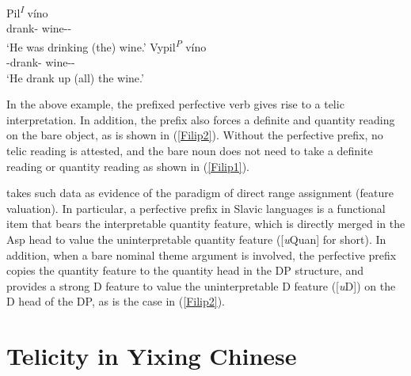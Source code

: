 \documentclass[output=paper]{langsci/langscibook}
\begin{document}
\begin{exe}
\ex {} \parencite[62]{filip1997}
    \begin{xlist}
	\ex\label{Filip1} \gll Pil\textsuperscript{\emph{I}} v\'ino \\
	        {drank-\Sg{}{}} {wine-\Sg{}-\Acc{}} \\
	    \glt \enquote*{He was drinking (the) wine.}
    \ex\label{Filip2} \gll  Vypil\textsuperscript{\emph{P}} v\'ino\\
            {\Pfv{}-drank-\Sg{}{}} {wine-\Sg{}-\Acc{}} \\
        \glt \enquote*{He drank up (all) the wine.}
\end{xlist}
\end{exe}

In the above example, the prefixed perfective verb gives rise to a telic
interpretation. In     addition, the prefix also forces a definite and quantity
reading on the bare object, as is shown in (\ref{Filip2}). Without the
perfective prefix, no telic reading is attested, and the bare noun does not
need to take a definite reading or quantity reading as shown in (\ref{Filip1}).

\textcite{Borer2005b} takes such data as evidence of the paradigm of direct
range assignment (feature valuation). In particular, a perfective prefix in
Slavic languages is a functional item that bears the interpretable quantity
feature, which is directly merged in the Asp head to value the
uninterpretable quantity feature ([\emph{u}Quan] for short). In addition, when
a bare nominal theme argument is involved, the perfective prefix copies the
quantity feature to the quantity head in the DP structure, and provides a
strong D feature to value the uninterpretable D feature ([\emph{u}D])
on the D head of the DP, as is the case in (\ref{Filip2}).

\section{Telicity in Yixing Chinese}
\end{document}
